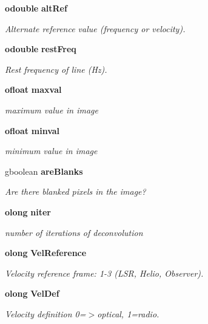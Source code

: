 \begin{CompactItemize}
{\bf odouble} {\bf alt\-Ref}
\begin{CompactList}\small\item\em Alternate reference value (frequency or velocity). \item\end{CompactList}\item 
{\bf odouble} {\bf rest\-Freq}
\begin{CompactList}\small\item\em Rest frequency of line (Hz). \item\end{CompactList}\item 
{\bf ofloat} {\bf maxval}
\begin{CompactList}\small\item\em maximum value in image \item\end{CompactList}\item 
{\bf ofloat} {\bf minval}
\begin{CompactList}\small\item\em minimum value in image \item\end{CompactList}\item 
gboolean {\bf are\-Blanks}
\begin{CompactList}\small\item\em Are there blanked pixels in the image? \item\end{CompactList}\item 
{\bf olong} {\bf niter}
\begin{CompactList}\small\item\em number of iterations of deconvolution \item\end{CompactList}\item 
{\bf olong} {\bf Vel\-Reference}
\begin{CompactList}\small\item\em Velocity reference frame: 1-3 (LSR, Helio, Observer). \item\end{CompactList}\item 
{\bf olong} {\bf Vel\-Def}
\begin{CompactList}\small\item\em Velocity definition 0=$>$optical, 1=radio. \item\end{CompactList}\item 

\end{CompactItemize}
